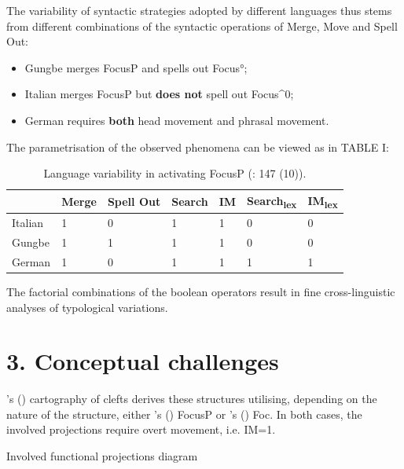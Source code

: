 \documentclass[fleqn,10pt]{wlscirep}
\begin{document}
\noindent The variability of syntactic strategies adopted by different languages thus stems from different combinations of the syntactic operations of Merge, Move and Spell Out: 

\begin{itemize}
\item Gungbe merges FocusP and spells out Focus°; 
\item \vspace*{-2mm} Italian merges FocusP but \textbf{does not} spell out Focus^0; 
\item \vspace*{-2mm} German requires \textbf{both} head movement and phrasal movement. 
\end{itemize}

\noindent The parametrisation of the observed phenomena can be viewed as in TABLE I:

\begin{table}[H]
    \centering
    \begin{tabular}{|l|l|l|l|l|l|l|}
    \hline
     & Merge & Spell Out & Search & IM & Search\textsubscript{lex} & IM\textsubscript{lex} \\
    \hline
    Italian & 1 & 0 & 1 & 1 & 0 & 0 \\
    \hline
    Gungbe & 1 & 1 & 1 & 1 & 0 & 0 \\
    \hline
    German & 1 & 0 & 1 & 1 & 1 & 1 \\
    \hline
    \end{tabular}
    \caption{\label{tab:samp}Language variability in activating FocusP (\citealt{samo2019cartography}: 147 (10)).}
    \end{table}

\noindent The factorial combinations of the boolean operators result in fine cross-linguistic analyses of typological variations.


\section*{3. Conceptual challenges}

\citeauthor{belletti2015}’s (\citeyear{belletti2015}) cartography of clefts derives these structures utilising, depending on the nature of the structure, either \citeauthor{rizzi1997fine}’s (\citeyear{rizzi1997fine}) FocusP or \citeauthor{belletti2004}’s (\citeyear{belletti2004}) Foc. 
In both cases, the involved projections require overt movement, i.e. IM=1.

\begin{exe}
    \ex Involved functional projections diagram
\end{exe}
\end{document}
